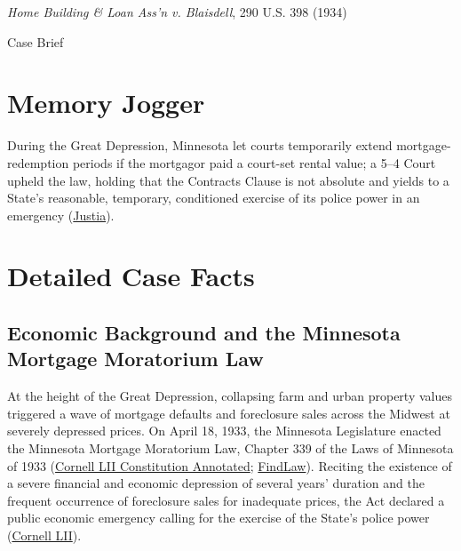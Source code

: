 \documentclass[12pt]{article}
\begin{document}
\begin{center}
{\LARGE \textit{Home Building \& Loan Ass'n v. Blaisdell}, 290 U.S. 398 (1934)\par}
\vspace{0.8em}
{\large Case Brief\par}
\end{center}
\vspace{1em}

\section{Memory Jogger}
During the Great Depression, Minnesota let courts temporarily extend mortgage-redemption periods if the mortgagor paid a court-set rental value; a 5--4 Court upheld the law, holding that the Contracts Clause is not absolute and yields to a State's reasonable, temporary, conditioned exercise of its police power in an emergency (\href{https://supreme.justia.com/cases/federal/us/290/398/}{Justia}).

\section{Detailed Case Facts}
\subsection{Economic Background and the Minnesota Mortgage Moratorium Law}
At the height of the Great Depression, collapsing farm and urban property values triggered a wave of mortgage defaults and foreclosure sales across the Midwest at severely depressed prices. On April 18, 1933, the Minnesota Legislature enacted the Minnesota Mortgage Moratorium Law, Chapter 339 of the Laws of Minnesota of 1933 (\href{https://www.law.cornell.edu/constitution-conan/article-1/section-10/clause-1/contract-clause}{Cornell LII Constitution Annotated}; \href{https://caselaw.findlaw.com/court/us-supreme-court/290/398.html}{FindLaw}). Reciting the existence of a severe financial and economic depression of several years' duration and the frequent occurrence of foreclosure sales for inadequate prices, the Act declared a public economic emergency calling for the exercise of the State's police power (\href{https://www.law.cornell.edu/constitution-conan/article-1/section-10/clause-1/contract-clause}{Cornell LII}).
\end{document}

